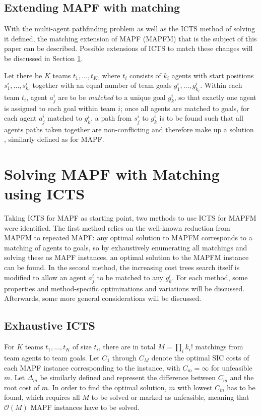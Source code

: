 \documentclass[english]{article}
\begin{document}
	\subsection{Extending MAPF with matching}
	With the multi-agent pathfinding problem as well as the ICTS method of solving it defined, the matching extension of MAPF (MAPFM) that is the subject of this paper can be described. Possible extensions of ICTS to match these changes will be discussed in Section \ref{section:icts-matching}.
	
	Let there be $K$ teams $t_1,\ldots, t_K$, where $t_i$ consists of $k_i$ agents with start positions $s_1^i,\ldots,s_{k_i}^i$ together with an equal number of team goals $g_1^i,\ldots,g_{k_i}^i$. Within each team $t_i$, agent $a_j^i$ are to be \textit{matched} to a unique goal $g_k^i$, so that exactly one agent is assigned to each goal within team $i$; once all agents are matched to goals, for each agent $a_j^i$ matched to $g_k^i$, a path from $s_j^i$ to $g_k^i$ is to be found such that all agents paths taken together are non-conflicting and therefore make up a solution \cite{ma2016}, similarly defined as for MAPF.
	
	
	\section{Solving MAPF with Matching using ICTS} %
	\label{section:icts-matching}
	Taking ICTS for MAPF as starting point, two methods to use ICTS for MAPFM were identified. The first method relies on the well-known reduction from MAPFM to repeated MAPF: any optimal solution to MAPFM corresponds to a matching of agents to goals, so by exhaustively enumerating all matchings and solving these as MAPF instances, an optimal solution to the MAPFM instance can be found. In the second method, the increasing cost trees search itself is modified to allow an agent $a_j^i$ to be matched to any $g_k^i$. For each method, some properties and method-specific optimizations and variations will be discussed. Afterwards, some more general considerations will be discussed.
	\subsection{Exhaustive ICTS}
	For $K$ teams $t_1,\ldots,t_K$ of size $t_i$, there are in total $M = \prod_{i} k_i!$ matchings from team agents to team goals. Let $C_1$ through $C_M$ denote the optimal SIC costs of each MAPF instance corresponding to the instance, with $C_m = \infty$ for unfeasible $m$. Let $\Delta_m$ be similarly defined and represent the difference between $C_m$ and the root cost of $m$. In order to find the optimal solution, $m$ with lowest $C_m$ has to be found, which requires all $M$ to be solved or marked as unfeasible, meaning that $\mathcal{O}(M)$ MAPF instances have to be solved. 
	
\end{document}
